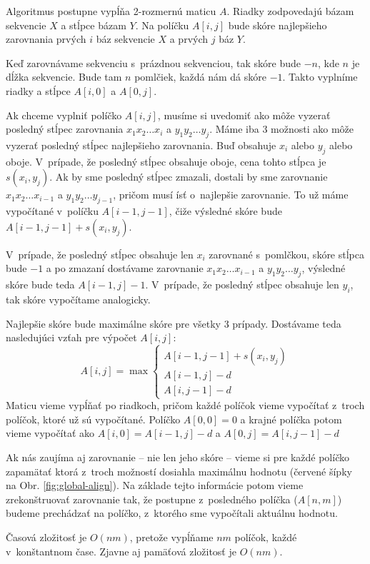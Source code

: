 Algoritmus postupne vypĺňa 2-rozmernú maticu $A$. Riadky zodpovedajú bázam sekvencie $X$ a stĺpce bázam $Y$. Na políčku $A[i,j]$ bude skóre najlepšieho zarovnania prvých $i$ báz sekvencie $X$ a prvých $j$ báz $Y$.

Keď zarovnávame sekvenciu s~prázdnou sekvenciou, tak skóre bude $-n$, kde $n$ je dĺžka sekvencie. Bude tam $n$ pomlčiek, každá nám dá skóre $-1$. Takto vyplníme riadky a stĺpce $A[i,0]$ a $A[0,j]$.

Ak chceme vyplniť políčko $A[i,j]$, musíme si uvedomiť ako môže vyzerať posledný stĺpec zarovnania $x_1x_2\dots x_i$ a $y_1y_2\dots y_j$. Máme iba 3 možnosti ako môže vyzerať posledný stĺpec najlepšieho zarovnania. Buď obsahuje $x_i$ alebo $y_j$ alebo oboje. V~prípade, že posledný stĺpec obsahuje oboje, cena tohto stĺpca je $s(x_i, y_j)$. Ak by sme posledný stĺpec zmazali, dostali by sme zarovnanie $x_1x_2\dots x_{i-1}$ a $y_1y_2\dots y_{j-1}$, pričom musí ísť o~najlepšie zarovnanie. To už máme vypočítané v~políčku $A[i-1, j-1]$, čiže výsledné skóre bude $A[i-1, j-1] + s(x_i,y_j)$.

V~prípade, že posledný stĺpec obsahuje len $x_i$ zarovnané s~pomlčkou, skóre stĺpca bude $-1$ a po zmazaní dostávame zarovnanie $x_1x_2\dots x_{i-1}$ a $y_1y_2\dots y_{j}$, výsledné skóre bude teda $A[i-1, j] -1$. V~prípade, že posledný stĺpec obsahuje len $y_i$, tak skóre vypočítame analogicky.

Najlepšie skóre bude maximálne skóre pre všetky 3 prípady.
Dostávame teda nasledujúci vzťah pre výpočet $A[i,j]$:
$$A[i,j] = \max \left\{
\begin{array}{l}
A[i-1,j-1]+s(x_i, y_j)\\
A[i-1,j]-d\\
A[i,j-1]-d
\end{array} \right.$$
Maticu vieme vypĺňať po riadkoch, pričom každé políčok vieme vypočítať z~troch políčok, ktoré už sú vypočítané. Políčko $A[0, 0] = 0$ a krajné políčka potom vieme vypočítať ako $A[i,0] = A[i-1,j]-d$ a $A[0, j] = A[i,j-1]-d$

Ak nás zaujíma aj zarovnanie -- nie len jeho skóre -- vieme si pre každé políčko zapamätať ktorá z~troch možností dosiahla maximálnu hodnotu
(červené šípky na Obr. \ref{fig:global-align}). Na základe tejto informácie potom vieme zrekonštruovať zarovnanie tak, že postupne z~posledného políčka ($A[n,m]$) budeme prechádzať na políčko, z~ktorého sme vypočítali aktuálnu hodnotu.

Časová zložitosť je $O(nm)$, pretože vypĺňame $nm$ políčok, každé v~konštantnom čase. Zjavne aj pamäťová zložitosť je $O(nm)$.

